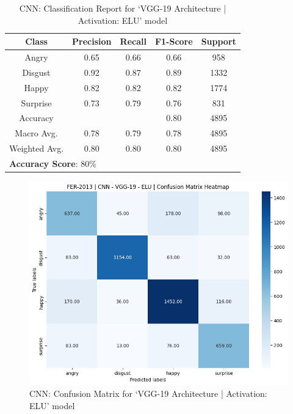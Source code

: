 \documentclass[conference]{IEEEtran}
\begin{document}
        \begin{table}[h]
          \caption{CNN: Classification Report for `VGG-19 Architecture | Activation: ELU' model}
          \label{tab:cnnVGG19ELUClasificationReport}
          \begin{tabular}{ccccc}
            \hline
            \textbf{Class} & \textbf{Precision} & \textbf{Recall} & \textbf{F1-Score} & \textbf{Support} \\
            \hline
            Angry & 0.65 & 0.66 & 0.66 & 958 \\
            Disgust & 0.92 & 0.87 & 0.89 & 1332 \\
            Happy & 0.82 & 0.82 & 0.82 & 1774 \\
            Surprise & 0.73 & 0.79 & 0.76 & 831 \\ \hline
            Accuracy & & & 0.80 & 4895 \\ \hline
            Macro Avg. & 0.78 & 0.79 & 0.78 & 4895 \\ \hline
            Weighted Avg. & 0.80 & 0.80 & 0.80 & 4895 \\ \hline
            \multicolumn{5}{l}{\textbf{Accuracy Score}: 80\%}
          \end{tabular}       
        \end{table}
        \begin{figure}[h]
          \centering
          \includegraphics[width=\columnwidth]{Figures/FER-2013_VGG19-ELU_CM.png}
          \caption{CNN: Confusion Matrix for `VGG-19 Architecture | Activation: ELU' model}
          \label{fig:cnnVGG19ELUConfusionMatrix}
        \end{figure}
\end{document}

